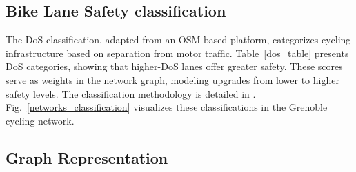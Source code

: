 \documentclass[letterpaper, 10 pt, conference]{ieeeconf}  %
\begin{document}
\subsection{Bike Lane  Safety classification}

The DoS classification, adapted from an OSM-based platform, categorizes cycling infrastructure based on separation from motor traffic. Table~\ref{dos_table} presents DoS categories, showing that higher-DoS lanes offer greater safety. These scores serve as weights in the network graph, modeling upgrades from lower to higher safety levels. The classification methodology is detailed in \cite{2024graphbased}. Fig.~\ref{networks_classification} visualizes these classifications in the Grenoble cycling network.

\subsection{Graph Representation}

\end{document}
